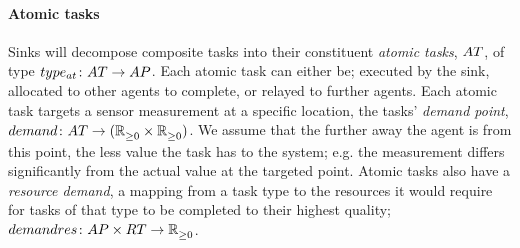 \paragraph{Atomic tasks}
\label{section:problem:atomic_tasks}
Sinks will decompose composite tasks into their constituent \textit{atomic tasks}, $\setAtomicTask{}{}$, of type $\formalAtomicTaskType{}{}$. Each atomic task can either be; executed by the sink, allocated to other agents to complete,  or relayed to further agents. Each atomic task targets a sensor measurement at a specific location, the tasks' \textit{demand point}, $\formalTaskDemandPoint{}{}$. We assume that the further away the agent is from this point, the less value the task has to the system; e.g. the measurement differs significantly from the actual value at the targeted point. Atomic tasks also have a \textit{resource demand}, a mapping from a task type to the resources it would require for tasks of that type to be completed to their highest quality; $\formalRequiredResources{}{}$. 


